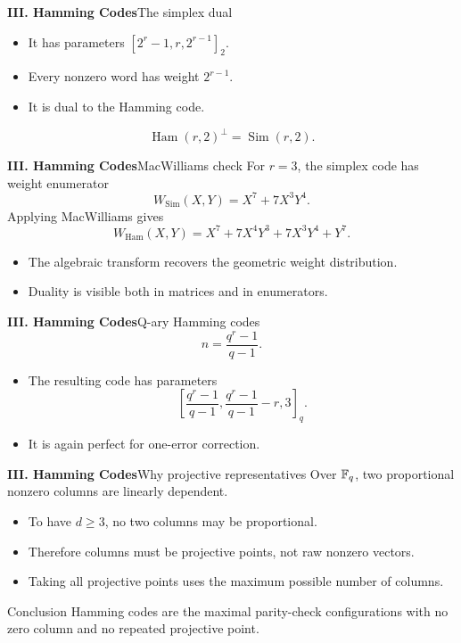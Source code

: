 \begin{frame}{\textbf{III. Hamming Codes}}{The simplex dual}
\small
{}
\begin{itemize}
  \item It has parameters $[2^r-1,r,2^{r-1}]_2$.
  \item Every nonzero word has weight $2^{r-1}$.
  \item It is dual to the Hamming code.
\end{itemize}
\[
  \operatorname{Ham}(r,2)^\perp=\operatorname{Sim}(r,2).
\]
\end{frame}

\begin{frame}{\textbf{III. Hamming Codes}}{MacWilliams check}
\small
For $r=3$, the simplex code has weight enumerator
\[
  W_{\operatorname{Sim}}(X,Y)=X^7+7X^3Y^4.
\]
Applying MacWilliams gives
\[
  W_{\operatorname{Ham}}(X,Y)=X^7+7X^4Y^3+7X^3Y^4+Y^7.
\]
\begin{itemize}
  \item The algebraic transform recovers the geometric weight distribution.
  \item Duality is visible both in matrices and in enumerators.
\end{itemize}
\end{frame}

\begin{frame}{\textbf{III. Hamming Codes}}{Q-ary Hamming codes}
\small
{}
\[
  n=\frac{q^r-1}{q-1}.
\]
\begin{itemize}
  \item The resulting code has parameters
  \[
    \left[\frac{q^r-1}{q-1},\frac{q^r-1}{q-1}-r,3\right]_q.
  \]
  \item It is again perfect for one-error correction.
\end{itemize}
\end{frame}

\begin{frame}{\textbf{III. Hamming Codes}}{Why projective representatives}
\small
Over $\mathbb{F}_q$, two proportional nonzero columns are linearly dependent.
\begin{itemize}
  \item To have $d\ge3$, no two columns may be proportional.
  \item Therefore columns must be projective points, not raw nonzero vectors.
  \item Taking all projective points uses the maximum possible number of columns.
\end{itemize}
\begin{block}{Conclusion}
Hamming codes are the maximal parity-check configurations with no zero column and no repeated projective point.
\end{block}
\end{frame}

